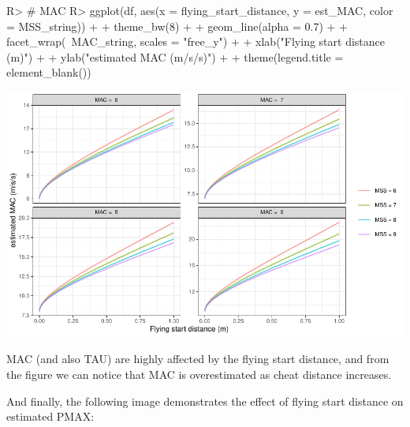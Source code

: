 \documentclass[
]{jss}
\begin{document}
\begin{CodeChunk}
\begin{CodeInput}
R> # MAC
R> ggplot(df, aes(x = flying_start_distance, y = est_MAC, color = MSS_string)) +
+   theme_bw(8) +
+   geom_line(alpha = 0.7) +
+   facet_wrap(~MAC_string, scales = "free_y") +
+   xlab("Flying start distance (m)") +
+   ylab("estimated MAC (m/s/s)") +
+   theme(legend.title = element_blank())
\end{CodeInput}


\begin{center}\includegraphics[width=1\linewidth]{paper_files/figure-latex/unnamed-chunk-28-1} \end{center}

\end{CodeChunk}

MAC (and also TAU) are highly affected by the flying start distance, and from the figure we can notice that MAC is overestimated as cheat distance increases.

And finally, the following image demonstrates the effect of flying start distance on estimated PMAX:
\end{document}
